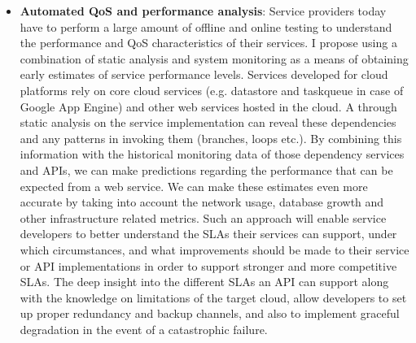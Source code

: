 \begin{itemize}
\item {\bf Automated QoS and performance analysis}: Service providers today have to perform
a large amount of offline and online testing to understand the performance and QoS characteristics
of their services. I propose using a combination of static analysis and system monitoring as a 
means of obtaining early estimates of service performance levels. Services developed for cloud
platforms rely on core cloud services (e.g. datastore and taskqueue in case of Google App Engine)
and other web services hosted
in the cloud. A through static analysis on the service implementation can reveal these dependencies
and any patterns in invoking them (branches, loops etc.). By combining this information with the
historical monitoring data of those dependency services and APIs, we can make predictions regarding
the performance that can be expected from a web service. We can make these estimates even
more accurate by taking into account the network usage, database growth and other infrastructure
related metrics. Such an approach will enable service developers to better understand the SLAs their
services can support, under which circumstances, and what improvements should be made to their 
service or API implementations
in order to support stronger and more competitive SLAs. The deep insight into the different SLAs
an API can support along with the knowledge on limitations of the target cloud, allow developers
to set up proper redundancy and backup channels, and also to implement graceful degradation
in the event of a catastrophic failure. 

\end{itemize}

